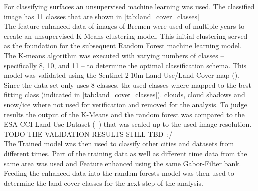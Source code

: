 \documentclass[12pt,a4paper, english]{article}
\begin{document}
      For classifying surfaces an unsupervised machine learning was used. 
      The classified image has 11 classes that are shown in \cref{tab:land_cover_classes}
      \\
      The feature enhanced data of images of Bremen%
      were used of multiple years to create an unsupervised K-Means clustering model.%
      This initial clustering served as the foundation for the subsequent Random Forest machine learning model.
      The K-means algorithm was executed with varying numbers of classes – specifically 8, 10, and 11 – to determine the optimal classification schema.
      This model was validated using the Sentinel-2 10m Land Use/Land Cover map (\autocite{Zhang}).
      Since the data set only uses 8 classes, the used classes where mapped to the best fitting class (indicated in \cref{tab:land_cover_classes}). 
      clouds, cloud shadows and snow/ice where not used for verification and removed for the analysis.
      To judge results the output of the K-Means and the random forest was compared to the ESA CCI Land Use Dataset (~\autocite{landformclassicationusingfuzzykmeans2000}) that was scaled up to the used image resolution. %
      \\
      TODO THE VALIDATION RESULTS STILL TBD~:/%
      \\ 
      The Trained model was then used to classify other cities and datasets from different times. 
      Part of the training data as well as different time data from the same area was used and Feature enhanced using the same Gabor-Filter bank.
      Feeding the enhanced data into the random forests model was then used to determine the land cover classes for the next step of the analysis.
\end{document}
